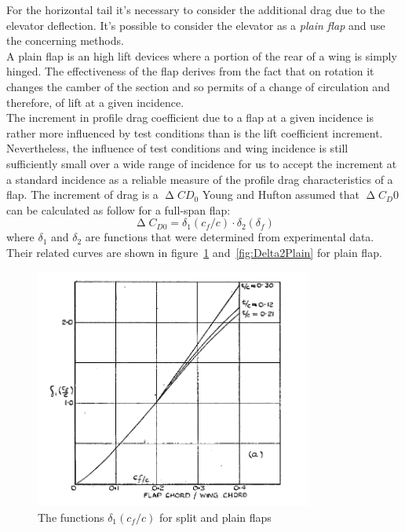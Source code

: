For the horizontal tail it's necessary to consider the additional drag due to the elevator deflection. It's possible to consider the elevator as a {\itshape plain flap} and use the concerning methods. \\
A plain flap is an high lift devices where a portion of the rear of a wing is simply hinged. The effectiveness of the flap derives from the fact that on rotation it changes the camber of the section and so permits of a change of circulation and therefore, of lift at a given incidence. \\
The increment in profile drag coefficient due to a flap at a given incidence is rather more influenced by test conditions than is the lift coefficient
increment. Nevertheless, the influence of test conditions and wing incidence is still sufficiently small over a wide range of incidence for us to accept the increment at a standard incidence as a reliable measure of the profile drag characteristics of a flap. \cite{Young:Flaps} The increment of drag is a $\upDelta CD_0$
Young and Hufton assumed that  $\upDelta C_D0$ can be calculated as follow for a full-span flap:
%
\begin{equation}
\upDelta C_{D0}=\delta_1\left(c_f/c\right)\cdot\delta_2\left(\delta_f\right)
\label{eqn:DeltaCD0FullSpan}
\end{equation}
%
where $\delta_1$ and $\delta_2$ are functions that were determined from experimental data. Their related curves are shown in figure~\ref{fig:Delta1Plain} and~\ref{fig:Delta2Plain} for plain flap.
%
\begin{figure}[H]
\centering
\includegraphics[height=7.9cm]{Immagini/Delta1_Plain}
\caption{The functions $\delta_1\left(c_f/c\right)$ for split and plain flaps}
\label{fig:Delta1Plain}
\end{figure}
%
